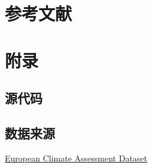 \documentclass[UTF8, a4paper]{ctexart}
\begin{document}
\section{参考文献}


\appendix
\setcounter{secnumdepth}{-2}
\section{附录}

\setcounter{secnumdepth}{3}
\subsection{源代码}

\subsection{数据来源}

\href{https://www.ecad.eu/}{European Climate Assessment  Dataset}
\end{document}
